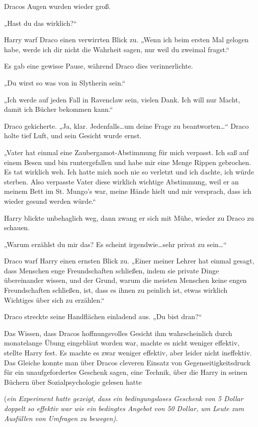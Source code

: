 {Dracos Augen wurden wieder groß.

„Hast du das wirklich?“

Harry warf Draco einen verwirrten Blick zu. „Wenn ich beim ersten Mal gelogen habe, werde ich dir nicht die Wahrheit sagen, nur weil du zweimal fragst.“

Es gab eine gewisse Pause, während Draco dies verinnerlichte.

„Du wirst so was von in Slytherin sein.“

„Ich werde auf jeden Fall in Ravenclaw sein, vielen Dank. Ich will nur Macht, damit ich Bücher bekommen kann.“

Draco gekicherte. „Ja, klar. Jedenfalls…um deine Frage zu beantworten…“ Draco holte tief Luft, und sein Gesicht wurde ernst.

„Vater hat einmal eine Zaubergamot-Abstimmung für mich verpasst. Ich saß auf einem Besen und bin runtergefallen und habe mir eine Menge Rippen gebrochen. Es tat wirklich weh. Ich hatte mich noch nie so verletzt und ich dachte, ich würde sterben. Also verpasste Vater diese wirklich wichtige Abstimmung, weil er an meinem Bett im St. Mungo's war, meine Hände hielt und mir versprach, dass ich wieder gesund werden würde.“

Harry blickte unbehaglich weg, dann zwang er sich mit Mühe, wieder zu Draco zu schauen.

„Warum erzählst du mir das? Es scheint irgendwie…sehr privat zu sein…“

Draco warf Harry einen ernsten Blick zu. „Einer meiner Lehrer hat einmal gesagt, dass Menschen enge Freundschaften schließen, indem sie private Dinge übereinander wissen, und der Grund, warum die meisten Menschen keine engen Freundschaften schließen, ist, dass es ihnen zu peinlich ist, etwas wirklich Wichtiges über sich zu erzählen.“

Draco streckte seine Handflächen einladend aus. „Du bist dran?“

Das Wissen, dass Dracos hoffnungsvolles Gesicht ihm wahrscheinlich durch monatelange Übung eingebläut worden war, machte es nicht weniger effektiv, stellte Harry fest. Es machte es zwar weniger effektiv, aber leider nicht ineffektiv. Das Gleiche konnte man über Dracos cleveren Einsatz von Gegenseitigkeitsdruck für ein unaufgefordertes Geschenk sagen, eine Technik, über die Harry in seinen Büchern über Sozialpsychologie gelesen hatte

(\emph{ein Experiment hatte gezeigt, dass ein bedingungsloses Geschenk von 5 Dollar doppelt so effektiv war wie ein bedingtes Angebot von 50 Dollar, um Leute zum Ausfüllen von Umfragen zu bewegen)}.

}
